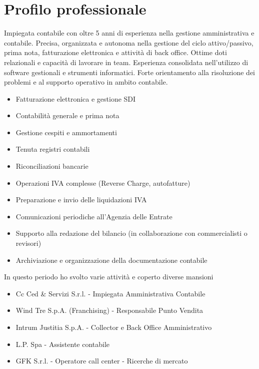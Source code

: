 \documentclass{resume}
\begin{document}



\section{\textbf{Profilo professionale}}
Impiegata contabile con oltre 5 anni di esperienza nella gestione amministrativa e contabile. Precisa,
organizzata e autonoma nella gestione del ciclo attivo/passivo, prima nota, fatturazione elettronica e attività di
back office. Ottime doti relazionali e capacità di lavorare in team. Esperienza consolidata nell'utilizzo di
software gestionali e strumenti informatici. Forte orientamento alla risoluzione dei problemi e al supporto
operativo in ambito contabile.

\begin{itemize}
  \item Fatturazione elettronica e gestione SDI
  \item Contabilità generale e prima nota
  \item Gestione cespiti e ammortamenti
  \item Tenuta registri contabili
  \item Riconciliazioni bancarie
  \item Operazioni IVA complesse (Reverse Charge, autofatture)
  \item Preparazione e invio delle liquidazioni IVA
  \item Comunicazioni periodiche all'Agenzia delle Entrate
  \item Supporto alla redazione del bilancio (in collaborazione con commercialisti o revisori)
  \item Archiviazione e organizzazione della documentazione contabile
\end{itemize}

In questo periodo ho svolto varie attività e coperto diverse mansioni
\begin{itemize}
  \item Cc Ced \& Servizi S.r.l. - Impiegata Amministrativa Contabile
  \item Wind Tre S.p.A. (Franchising) - Responsabile Punto Vendita
  \item Intrum Justitia S.p.A. - Collector e Back Office Amministrativo
  \item L.P. Spa - Assistente contabile
  \item GFK S.r.l. - Operatore call center - Ricerche di mercato
\end{itemize}
\end{document}
